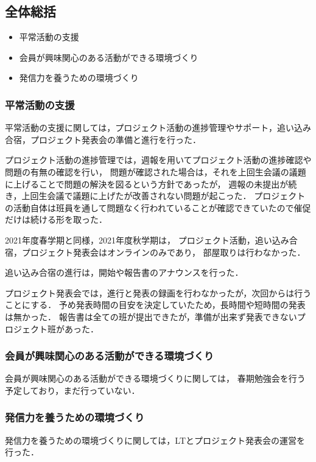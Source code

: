 \subsection*{全体総括}


\begin{itemize}
  \item 平常活動の支援
  \item 会員が興味関心のある活動ができる環境づくり
  \item 発信力を養うための環境づくり
\end{itemize}

\subsubsection*{平常活動の支援}
平常活動の支援に関しては，プロジェクト活動の進捗管理やサポート，追い込み合宿，プロジェクト発表会の準備と進行を行った．

プロジェクト活動の進捗管理では，週報を用いてプロジェクト活動の進捗確認や問題の有無の確認を行い，
問題が確認された場合は，それを上回生会議の議題に上げることで問題の解決を図るという方針であったが，
週報の未提出が続き，上回生会議で議題に上げたが改善されない問題が起こった．
プロジェクトの活動自体は班員を通して問題なく行われていることが確認できていたので催促だけは続ける形を取った．

2021年度春学期と同様，2021年度秋学期は，
プロジェクト活動，追い込み合宿，プロジェクト発表会はオンラインのみであり，
部屋取りは行わなかった．

追い込み合宿の進行は，開始や報告書のアナウンスを行った．

プロジェクト発表会では，進行と発表の録画を行わなかったが，次回からは行うことにする．
予め発表時間の目安を決定していたため，長時間や短時間の発表は無かった．
報告書は全ての班が提出できたが，準備が出来ず発表できないプロジェクト班があった．

\subsubsection*{会員が興味関心のある活動ができる環境づくり}
会員が興味関心のある活動ができる環境づくりに関しては，
春期勉強会を行う予定しており，まだ行っていない．

\subsubsection*{発信力を養うための環境づくり}
発信力を養うための環境づくりに関しては，LTとプロジェクト発表会の運営を行った．

